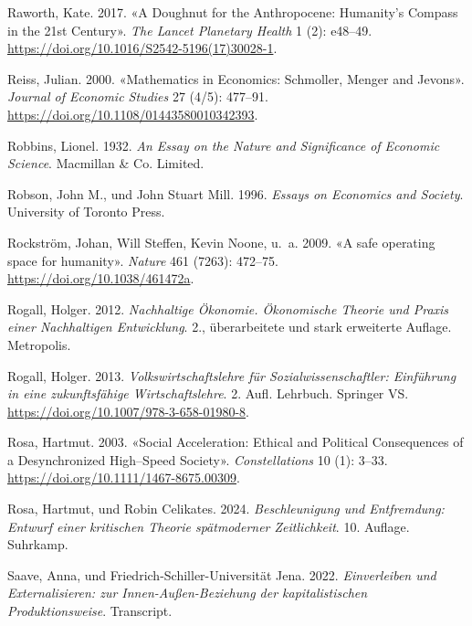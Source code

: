 \documentclass[
  nswissgerman,
  a4paper,
  DIV=11,
  numbers=noendperiod,
  oneside,
  openany]{scrreprt}
\newlength{\cslhangindent}
\newenvironment{CSLReferences}[2] %
 {\begin{list}{}{%
  \setlength{\itemindent}{0pt}
  \setlength{\leftmargin}{0pt}
  \setlength{\parsep}{0pt}
  \ifodd #1
   \setlength{\leftmargin}{\cslhangindent}
   \setlength{\itemindent}{-1\cslhangindent}
  \fi
  \setlength{\itemsep}{#2\baselineskip}}}
 {\end{list}}
\begin{document}
\begin{CSLReferences}{1}{1}
Raworth, Kate. 2017. {«A Doughnut for the Anthropocene: Humanity's
Compass in the 21st Century»}. \emph{The Lancet Planetary Health} 1 (2):
e48--49. \url{https://doi.org/10.1016/S2542-5196(17)30028-1}.

Reiss, Julian. 2000. {«Mathematics in Economics: Schmoller, Menger and
Jevons»}. \emph{Journal of Economic Studies} 27 (4/5): 477--91.
\url{https://doi.org/10.1108/01443580010342393}.

Robbins, Lionel. 1932. \emph{An Essay on the Nature and Significance of
Economic Science}. Macmillan \& Co. Limited.

Robson, John M., und John Stuart Mill. 1996. \emph{Essays on Economics
and Society}. University of Toronto Press.

Rockström, Johan, Will Steffen, Kevin Noone, u.~a. 2009. {«A safe
operating space for humanity»}. \emph{Nature} 461 (7263): 472--75.
\url{https://doi.org/10.1038/461472a}.

Rogall, Holger. 2012. \emph{Nachhaltige Ökonomie. Ökonomische Theorie
und Praxis einer Nachhaltigen Entwicklung}. 2., überarbeitete und stark
erweiterte Auflage. Metropolis.

Rogall, Holger. 2013. \emph{Volkswirtschaftslehre für
{Sozialwissenschaftler}: {Einführung} in eine zukunftsfähige
{Wirtschaftslehre}}. 2. Aufl. Lehrbuch. Springer VS.
\url{https://doi.org/10.1007/978-3-658-01980-8}.

Rosa, Hartmut. 2003. {«Social Acceleration: Ethical and Political
Consequences of a Desynchronized High--Speed Society»}.
\emph{Constellations} 10 (1): 3--33.
\url{https://doi.org/10.1111/1467-8675.00309}.

Rosa, Hartmut, und Robin Celikates. 2024. \emph{Beschleunigung und
Entfremdung: Entwurf einer kritischen Theorie spätmoderner
Zeitlichkeit}. 10. Auflage. Suhrkamp.

Saave, Anna, und Friedrich-Schiller-Universität Jena. 2022.
\emph{Einverleiben und Externalisieren: zur Innen-Außen-Beziehung der
kapitalistischen Produktionsweise}. Transcript.


\end{CSLReferences}
\end{document}
